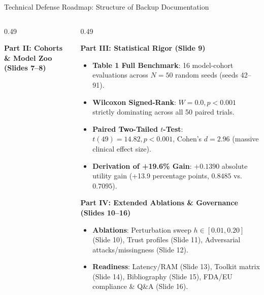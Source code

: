 \documentclass[aspectratio=169,10pt]{beamer}
\begin{document}
\begin{frame}{Technical Defense Roadmap: Structure of Backup Documentation}
\begin{columns}[t]
\begin{column}{0.49\textwidth}
\begin{block}{\textbf{Part II: Cohorts \& Model Zoo (Slides 7--8)}}
\begin{itemize}
        \end{itemize}
      \end{block}
    \end{column}
    \begin{column}{0.49\textwidth}
      \begin{block}{\textbf{Part III: Statistical Rigor (Slide 9)}}
        \scriptsize
        \begin{itemize}\setlength\itemsep{1pt}
          \item \textbf{Table 1 Full Benchmark}: 16 model-cohort evaluations across $N=50$ random seeds (seeds 42--91).
          \item \textbf{Wilcoxon Signed-Rank}: $W = 0.0, p < 0.001$ strictly dominating across all 50 paired trials.
          \item \textbf{Paired Two-Tailed $t$-Test}: $t(49) = 14.82, p < 0.001$, Cohen's $d = 2.96$ (massive clinical effect size).
          \item \textbf{Derivation of +19.6\% Gain}: $+0.1390$ absolute utility gain (+13.9 percentage points, $0.8485$ vs. $0.7095$).
        \end{itemize}
      \end{block}
      \vspace{0.03cm}
      \begin{block}{\textbf{Part IV: Extended Ablations \& Governance (Slides 10--16)}}
        \scriptsize
        \begin{itemize}\setlength\itemsep{1pt}
          \item \textbf{Ablations}: Perturbation sweep $h \in [0.01, 0.20]$ (Slide 10), Trust profiles (Slide 11), Adversarial attacks/missingness (Slide 12).
          \item \textbf{Readiness}: Latency/RAM (Slide 13), Toolkit matrix (Slide 14), Bibliography (Slide 15), FDA/EU compliance \& Q\&A (Slide 16).
        \end{itemize}
      \end{block}
    \end{column}
  \end{columns}
\end{frame}
\end{document}
